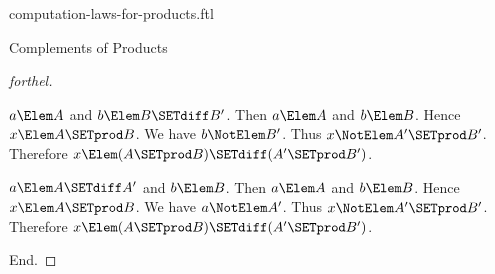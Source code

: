 \documentclass{stex}
\begin{document}
\begin{smodule}{computation-laws-for-products.ftl}
\begin{sfragment}{Complements of Products}
\begin{proof}[forthel]
      \begin{case}{$a \Elem A$ and $b \Elem B \SETdiff B'$.}
        Then $a \Elem A$ and $b \Elem B$.
        Hence $x \Elem A \SETprod B$.
        We have $b \NotElem B'$.
        Thus $x \NotElem A' \SETprod B'$.
        Therefore $x \Elem (A \SETprod B) \SETdiff (A' \SETprod B')$.
      \end{case}

      \begin{case}{$a \Elem A \SETdiff A'$ and $b \Elem B$.}
        Then $a \Elem A$ and $b \Elem B$.
        Hence $x \Elem A \SETprod B$.
        We have $a \NotElem A'$.
        Thus $x \NotElem A' \SETprod B'$.
        Therefore $x \Elem (A \SETprod B) \SETdiff (A' \SETprod B')$.
      \end{case}
    End.
  \end{proof}
\end{sfragment}
\end{smodule}
\end{document}
